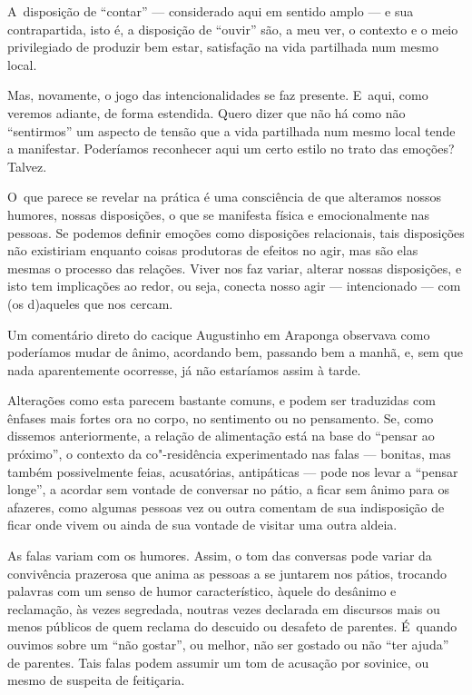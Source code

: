 A~disposição de ``contar'' --- considerado aqui em sentido amplo --- e sua
contrapartida, isto é, a disposição de ``ouvir'' são, a meu ver, o contexto
e o meio privilegiado de produzir bem estar, satisfação na vida
partilhada num mesmo local.

Mas, novamente, o jogo das intencionalidades se faz presente. E~aqui, como
veremos adiante, de forma estendida. Quero dizer que não há como não
``sentirmos'' um aspecto de tensão que a vida partilhada num mesmo local
tende a manifestar. Poderíamos reconhecer aqui um certo estilo no trato
das emoções? Talvez.

O~que parece se revelar na prática é uma consciência de que alteramos
nossos humores, nossas disposições, o que se manifesta física e
emocionalmente nas pessoas. Se podemos definir emoções como disposições
relacionais, tais disposições não existiriam enquanto coisas produtoras
de efeitos no agir, mas são elas mesmas o processo das relações. Viver
nos faz variar, alterar nossas disposições, e isto tem implicações ao
redor, ou seja, conecta nosso agir --- intencionado --- com (os d)aqueles
que nos cercam. 

Um comentário direto do cacique Augustinho em Araponga observava como
poderíamos mudar de ânimo, acordando bem, passando bem a manhã, e, sem
que nada aparentemente ocorresse, já não estaríamos assim à tarde.

Alterações como esta parecem bastante comuns, e podem ser traduzidas com
ênfases mais fortes ora no corpo, no sentimento ou no pensamento. Se,
como dissemos anteriormente, a relação de alimentação está na base do
``pensar ao próximo'', o contexto da co"-residência experimentado nas
falas --- bonitas, mas também possivelmente feias, acusatórias,
antipáticas --- pode nos levar a ``pensar longe'', a acordar sem vontade de
conversar no pátio, a ficar sem ânimo para os afazeres, como
algumas pessoas vez ou outra comentam de sua indisposição de ficar onde
vivem ou ainda de sua vontade de visitar uma outra aldeia.

As falas variam com os humores. Assim, o tom das conversas pode variar
da convivência prazerosa que anima as pessoas a se juntarem nos pátios,
trocando palavras com um senso de humor característico, àquele do
desânimo e reclamação, às vezes segredada, noutras vezes declarada em
discursos mais ou menos públicos de quem reclama do descuido ou
desafeto de parentes. É~quando ouvimos sobre um ``não gostar'', ou
melhor, não ser gostado ou não ``ter ajuda'' de parentes. Tais falas
podem assumir um tom de acusação por sovinice, ou mesmo de suspeita de
feitiçaria.

